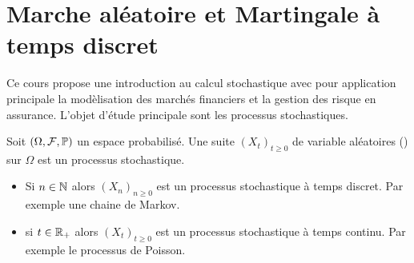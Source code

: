 \chapter{Marche aléatoire et Martingale à temps discret}\label{chap:marche_aléatoire}
Ce cours propose une introduction au calcul stochastique avec pour application principale la modèlisation des marchés financiers et la gestion des risque en assurance. L'objet d'étude principale sont les processus stochastiques. 
\begin{definition}\label{def:filtration}
Soit $(\Omega, \mathcal{F}, \mathbb{P})$ un espace probabilisé. Une suite $(X_t)_{t\geq0}$ de variable aléatoires (\va) sur $\Omega$ est un processus stochastique.
  \begin{itemize}
    \item Si $n\in \mathbb{N}$ alors $(X_n)_{n\geq0}$ est un processus stochastique à temps discret. Par exemple une chaine de Markov. 
    \item si $t\in \mathbb{R}_+$ alors $(X_t)_{t\geq0}$ est un processus stochastique à temps continu. Par exemple le processus de Poisson. 
  \end{itemize}
\end{definition}

